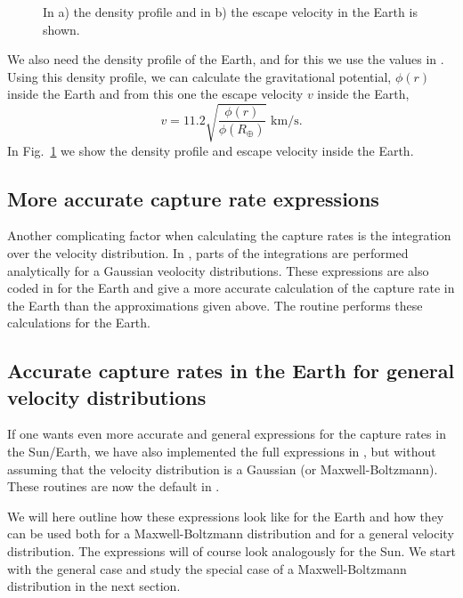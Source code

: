 \begin{figure}
\centerline{}
\caption{In a) the density profile and in b) the escape velocity in the Earth is shown.}
\label{fig:eadensvesc}
\end{figure}

We also need the density profile of the Earth, and for this we use the
values in \cite{EncBrit}. Using this density profile, we can calculate
the gravitational potential, $\phi(r)$ inside the Earth and from this
one the escape velocity $v$ inside the Earth,
\begin{equation}
   \label{eq:vesc}
   v = 11.2 \sqrt{\frac{\phi(r)}{\phi(R_\oplus)}} \mbox{~km/s.}
\end{equation}
In Fig.~\ref{fig:eadensvesc} we show the density profile and escape
velocity inside the Earth. 

\subsection{More accurate capture rate expressions}

Another complicating factor when calculating the capture rates is the
integration over the velocity 
distribution. In \cite{Gould87}, parts of the integrations are
performed analytically for a Gaussian veolocity distributions. These
expressions are also coded in \ds for the Earth and give a more
accurate calculation of the capture rate in the Earth than the
approximations given above. The routine  performs
these calculations for the Earth.

\subsection{Accurate capture rates in the Earth for general velocity distributions}


If one wants even more accurate and general expressions for the
capture rates in the Sun/Earth, we have also implemented the full
expressions in \cite{Gould87}, but without assuming that the velocity
distribution is a Gaussian (or Maxwell-Boltzmann). These routines are
now the default in \ds.

We will here outline how these expressions look
like for the Earth and how they can be used both for a Maxwell-Boltzmann
distribution and for a general velocity distribution. The expressions
will of course look analogously for the Sun. We start with
the general case and study the special case of a Maxwell-Boltzmann
distribution in the next section. 

